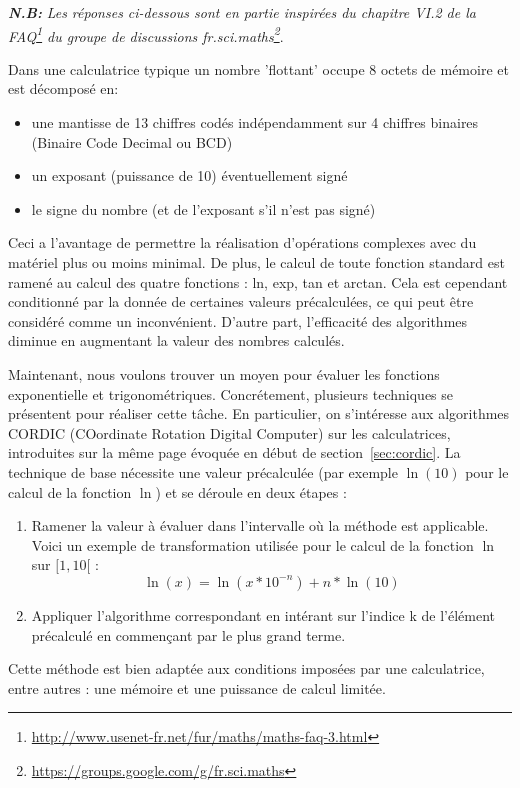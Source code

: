 \documentclass{article}
\begin{document}
{\small \textit{\textbf{N.B:}} \emph{ Les réponses ci-dessous sont en partie inspirées du chapitre VI.2 de la FAQ\footnote{\url{http://www.usenet-fr.net/fur/maths/maths-faq-3.html}} du groupe de discussions fr.sci.maths\footnote{\url{https://groups.google.com/g/fr.sci.maths}}}.
  \vskip 0.01mm ~
 
  Dans une calculatrice typique un nombre 'flottant' occupe 8 octets de m\'emoire et est d\'ecompos\'e en:
  \begin{itemize}
     \item une mantisse de 13 chiffres cod\'es ind\'ependamment sur 4 chiffres binaires (Binaire Code Decimal ou BCD)
     \item un exposant (puissance de 10) \'eventuellement sign\'e
     \item le signe du nombre (et de l'exposant s'il n'est pas sign\'e)
  \end{itemize}

  Ceci a l'avantage de permettre la r\'ealisation d'op\'erations complexes avec du mat\'eriel plus ou moins minimal. De plus, le calcul de toute fonction standard est ramen\'e au calcul des quatre fonctions : ln, exp, tan et arctan. Cela est cependant conditionn\'e par la donnée de certaines valeurs pr\'ecalcul\'ees, ce qui peut \^etre consid\'er\'e comme un inconv\'enient. D'autre part, l'efficacit\'e des algorithmes diminue en augmentant la valeur des nombres calcul\'es.
  \vskip 1mm ~

  Maintenant, nous voulons trouver un moyen pour évaluer les fonctions exponentielle et trigonométriques. Concr\'etement, plusieurs techniques se pr\'esentent pour r\'ealiser cette t\^ache. En particulier, on s'int\'eresse aux algorithmes CORDIC (COordinate Rotation Digital Computer) sur les calculatrices, introduites sur la m\^eme page évoquée en début de section~\ref{sec:cordic}. La technique de base nécessite une valeur pr\'ecalcul\'ee (par exemple $\ln(10)$ pour le calcul de la fonction $\ln$) et se d\'eroule en deux \'etapes :
  \begin{enumerate}
  \item Ramener la valeur à \'evaluer dans l'intervalle où la m\'ethode est applicable. Voici un exemple de transformation utilis\'ee pour le calcul de la fonction $\ln$ sur $[1,10[$ :
      \begin{equation}
        \ln(x) = \ln(x*10^{-n}) + n*\ln(10)
        \label{eq:ln_exemple}
      \end{equation}
    \item Appliquer l'algorithme correspondant en int\'erant sur l'indice k de l'\'el\'ement pr\'ecalcul\'e en commen\c cant par le plus grand terme.
  \end{enumerate}
  Cette m\'ethode est bien adapt\'ee aux conditions impos\'ees par une calculatrice, entre autres : une m\'emoire et une puissance de calcul limit\'ee.
  \vskip 1mm ~

}
\end{document}

